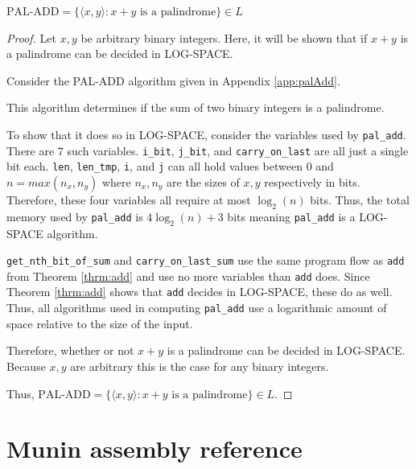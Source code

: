 \documentclass[11pt, a4paper]{article}
\begin{document}
\begin{theorem}
    \(\text{PAL-ADD} = \{\langle x, y \rangle : x + y \text{ is a palindrome}\} \in L\)
\end{theorem}

\begin{proof}
    Let \(x, y\) be arbitrary binary integers.
    Here, it will be shown that if \(x + y\) is a palindrome can be decided in LOG-SPACE.

    Consider the PAL-ADD algorithm given in Appendix \ref{app:palAdd}.

    This algorithm determines if the sum of two binary integers is a palindrome.

    To show that it does so in LOG-SPACE, consider the variables used by \lstinline|pal_add|.
    There are \(7\) such variables.
    \lstinline|i_bit|, \lstinline|j_bit|, and \lstinline|carry_on_last| are all just a single bit each.
    \lstinline|len|, \lstinline|len_tmp|, \lstinline|i|, and \lstinline|j| can all hold values between \(0\) and \(n = max(n_x, n_y)\) where \(n_x, n_y\) are the sizes of \(x, y\) respectively in bits.
    Therefore, these four variables all require at most \(\log_2(n)\) bits.
    Thus, the total memory used by \lstinline|pal_add| is \(4\log_2(n) + 3\) bits meaning \lstinline|pal_add| is a LOG-SPACE algorithm.

    \lstinline|get_nth_bit_of_sum| and \lstinline|carry_on_last_sum| use the same program flow as \lstinline|add| from Theorem \ref{thrm:add} and use no more variables than \lstinline|add| does.
    Since Theorem \ref{thrm:add} shows that \lstinline|add| decides in LOG-SPACE, these do as well.
    Thus, all algorithms used in computing \lstinline|pal_add| use a logarithmic amount of space relative to the size of the input.

    Therefore, whether or not \(x + y\) is a palindrome can be decided in LOG-SPACE.
    Because \(x, y\) are arbitrary this is the case for any binary integers.
    
    Thus, \(\text{PAL-ADD} = \{\langle x, y \rangle : x + y \text{ is a palindrome}\} \in L\).
\end{proof}

\newpage

\section{Munin assembly reference}\label{app:asmRef}
\end{document}
